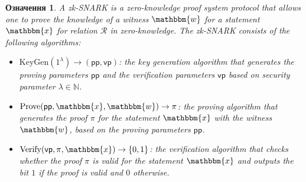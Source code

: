 \documentclass[12pt,a4paper,oneside]{book}
\theoremstyle{dplplain}
\theoremstyle{dpldefinition}
\newtheorem{definition}[theorem]{Означення}%
\theoremstyle{dplremark}
\begin{document}
\begin{definition}
    A zk-SNARK is a zero-knowledge proof system protocol that allows one to
    prove the knowledge of a witness $\mathbbm{w}$ for a statement $\mathbbm{x}$
    for relation $\mathcal{R}$ in zero-knowledge. The zk-SNARK consists of the
    following algorithms:
    \begin{itemize}
        \item $\mathrm{KeyGen}(1^{\lambda}) \to (\mathsf{pp},\mathsf{vp})$: the
        key generation algorithm that generates the proving parameters
        $\mathsf{pp}$ and the verification parameters $\mathsf{vp}$ based on
        security parameter $\lambda \in \mathbb{N}$.
        \item $\mathrm{Prove}(\mathsf{pp}, \mathbbm{x}, \mathbbm{w}) \to \pi$: the
        proving algorithm that generates the proof $\pi$ for the statement
        $\mathbbm{x}$ with the witness $\mathbbm{w}$, based on the proving 
        parameters $\mathsf{pp}$.
        \item $\mathrm{Verify}(\mathsf{vp}, \pi, \mathbbm{x}) \to \{0, 1\}$: the
        verification algorithm that checks whether the proof $\pi$ is valid for
        the statement $\mathbbm{x}$ and outputs the bit $1$ if the proof is
        valid and $0$ otherwise.
    \end{itemize}


\end{definition}
\end{document}
